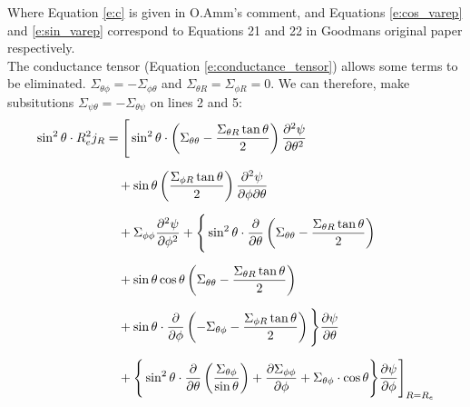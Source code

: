 \documentclass{article}
\begin{document}
Where Equation \ref{e:c} is given in O.Amm's comment, and Equations \ref{e:cos_varep} and \ref{e:sin_varep} correspond to Equations 21 and 22 in Goodmans original paper respectively.\\
The conductance tensor (Equation \ref{e:conductance_tensor}) allows some terms to be eliminated. $\Sigma_{\theta\phi} = -\Sigma_{\phi\theta}$ and $\Sigma_{\theta R} = \Sigma_{\phi R} = 0$. We can therefore, make subsitutions $\Sigma_{\psi\theta} = -\Sigma_{\theta\psi}$ on lines 2 and 5:
\begin{equation*}
	\begin{aligned}
		\sin^2\theta \cdot R_e^2j_R
		 & =  \Bigg[
			\sin^2 \theta \cdot \left( \Sigma_{\theta\theta} - \frac{\Sigma_{\theta R} \tan\theta}{2} \right)
		\pdv[2]{\psi}{\theta}                                                         \\[6pt]
		 & \quad + \sin\theta
		\left( \frac{\Sigma_{\phi R} \tan\theta}{2} \right)
		\pdv{\psi}{\phi}{\theta}                                                      \\[6pt]
		 & \quad + \Sigma_{\phi\phi}
		\pdv[2]{\psi}{\phi} + \Bigg\{
		\sin^2\theta\cdot \pdv{\theta}
		\left( \Sigma_{\theta\theta} - \frac{\Sigma_{\theta R} \tan\theta}{2} \right) \\[6pt]
		 & \quad + \sin \theta\cos\theta
		\left( \Sigma_{\theta\theta} - \frac{\Sigma_{\theta R} \tan\theta}{2} \right) \\[6pt]
		 & \quad + \sin\theta\cdot
		\pdv{\phi}
		\left( -\Sigma_{\theta\phi} - \frac{\Sigma_{\phi R} \tan\theta}{2} \right)
		\Bigg\}\pdv{\psi}{\theta}                                                     \\[6pt]
		 & \quad + \Bigg\{\sin^2\theta\cdot\pdv{\theta}
		\left( \frac{\Sigma_{\theta\phi}}{\sin\theta} \right) +
		\pdv{\Sigma_{\phi\phi}}{\phi}
		+ \Sigma_{\theta\phi}\cdot\cos\theta
		\Bigg\}\pdv{\psi}{\phi}
		\Bigg]_{R = R_e}
	\end{aligned}
\end{equation*}
\end{document}
